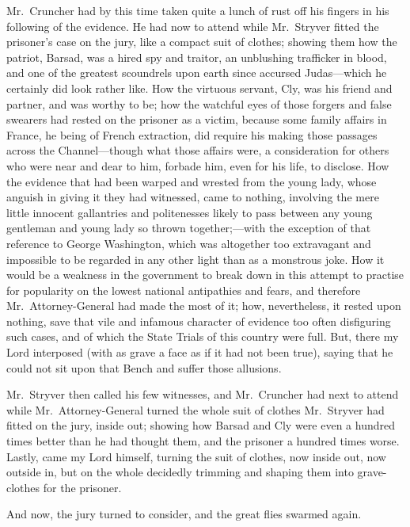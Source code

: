 Mr.\ Cruncher had by this time taken quite a lunch of rust off his
fingers in his following of the evidence.  He had now to attend while
Mr.\ Stryver fitted the prisoner's case on the jury, like a compact
suit of clothes; showing them how the patriot, Barsad, was a hired spy
and traitor, an unblushing trafficker in blood, and one of the greatest
scoundrels upon earth since accursed Judas---which he certainly did
look rather like.  How the virtuous servant, Cly, was his friend and
partner, and was worthy to be; how the watchful eyes of those forgers
and false swearers had rested on the prisoner as a victim, because
some family affairs in France, he being of French extraction, did
require his making those passages across the Channel---though what
those affairs were, a consideration for others who were near and dear
to him, forbade him, even for his life, to disclose.  How the evidence
that had been warped and wrested from the young lady, whose anguish in
giving it they had witnessed, came to nothing, involving the mere
little innocent gallantries and politenesses likely to pass between
any young gentleman and young lady so thrown together;---with the
exception of that reference to George Washington, which was altogether
too extravagant and impossible to be regarded in any other light than
as a monstrous joke.  How it would be a weakness in the government to
break down in this attempt to practise for popularity on the lowest
national antipathies and fears, and therefore Mr.\ Attorney-General had
made the most of it; how, nevertheless, it rested upon nothing, save
that vile and infamous character of evidence too often disfiguring
such cases, and of which the State Trials of this country were full.
But, there my Lord interposed (with as grave a face as if it had not
been true), saying that he could not sit upon that Bench and suffer
those allusions.

Mr.\ Stryver then called his few witnesses, and Mr.\ Cruncher had next
to attend while Mr.\ Attorney-General turned the whole suit of clothes
Mr.\ Stryver had fitted on the jury, inside out; showing how Barsad and
Cly were even a hundred times better than he had thought them, and the
prisoner a hundred times worse.  Lastly, came my Lord himself, turning
the suit of clothes, now inside out, now outside in, but on the whole
decidedly trimming and shaping them into grave-clothes for the
prisoner.

And now, the jury turned to consider, and the great flies swarmed again.

